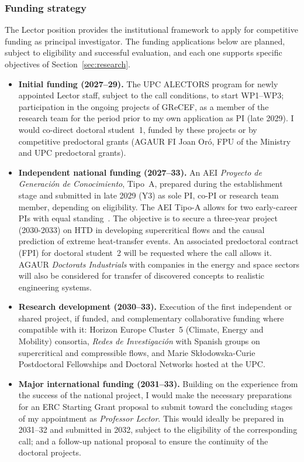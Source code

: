 \documentclass[11pt]{article}
\newcommand{\NEW}[1]{\iffinal #1\else{\color{red}#1}\fi}
\begin{document}
\subsubsection{Funding strategy}
The Lector position provides the institutional framework to
apply for competitive funding as principal investigator. 
The funding applications below are planned, subject to eligibility and successful evaluation, and each one supports specific objectives of Section~\ref{sec:research}.
\begin{itemize}
  \item \textbf{Initial funding (2027--29).} The UPC ALECTORS program for newly appointed Lector staff, subject to the call conditions, to start WP1--WP3; participation in the ongoing projects of GReCEF, as a member of the research team for the period prior to my own application as PI (late 2029). 
  I would co-direct doctoral student~1, funded by these projects or by competitive predoctoral grants (AGAUR FI Joan Or\'o, FPU of the Ministry and UPC predoctoral grants).
  
  \item \textbf{Independent national funding (2027--33).} An AEI \emph{Proyecto de Generaci\'on de Conocimiento}, Tipo~A, prepared during the establishment stage and submitted in late 2029 (Y3) as sole PI, co-PI or research team member, depending on eligibility. 
  The AEI Tipo-A allows for two early-career PIs with equal standing~\cite{AEI2025}. 
  The objective is to secure a three-year project (2030-2033) on HTD in developing supercritical flows and the causal prediction of extreme heat-transfer events. 
  An associated predoctoral contract (FPI) for doctoral student~2 will be requested where the call allows it. 
  AGAUR \emph{Doctorats Industrials} with companies in the energy and space sectors will also be considered for transfer of discovered concepts to realistic engineering systems.
  
  \item \textbf{Research development (2030--33).} Execution of the first independent or shared project, if funded, and complementary collaborative funding where compatible with it: Horizon Europe Cluster~5 (Climate, Energy and Mobility) consortia, \emph{Redes de Investigaci\'on}   with Spanish groups on supercritical and compressible flows, and Marie Sk\l{}odowska-Curie Postdoctoral Fellowships and Doctoral Networks hosted at the UPC.
  
  \item \textbf{Major international funding (2031--33).} Building on the experience from \NEW{the success} of the national project, I would make the \NEW{necessary} preparations for an ERC Starting Grant proposal to submit toward the concluding stages of my appointment as \textit{\NEW{Professor} Lector}. This would ideally be prepared in 2031--32 and submitted in 2032, subject to the eligibility of the corresponding call; and a follow-up national proposal to ensure the continuity of the doctoral projects.
\end{itemize}
\end{document}
